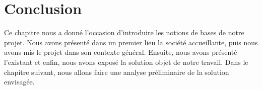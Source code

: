 \section*{Conclusion}

Ce chapitre nous a donné l’occasion d’introduire les notions de bases de notre projet. Nous avons présenté dans un premier lieu la société accueillante, puis nous avons mis le projet dans son contexte général. Ensuite, nous avons présenté l'existant et  enfin, nous avons exposé la solution objet de notre travail. Dans le chapitre suivant, nous allons faire une analyse préliminaire de la solution envisagée.
